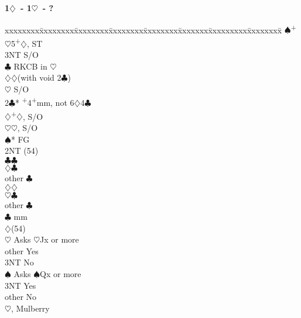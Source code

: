 \documentclass[10pt]{article}
\renewcommand{\c}{$\clubsuit$}
\renewcommand{\d}{$\diamondsuit$}
\newcommand{\h}{$\heartsuit$}
\newcommand{\s}{$\spadesuit$}
\newcommand{\p}{\textsuperscript{+}}
\newenvironment{bidtable}[1][]
{\textbf{#1}
  \begin{adjustwidth}{1em}{}
    \addvspace{2pt}
    \begin{tabbing}
      xxxxxxxx\=xxxxxxxx\=xxxxxxxx\=xxxxxxxx\=xxxxxxxx\=xxxxxxx\=xxxxxxxxx\=xxxxxxxx\=\kill}
{\end{tabbing}\end{adjustwidth}\bigskip}%
\begin{document}
\begin{bidtable}[1\d\ - 1\h\ - ?]
     \s  {}\p\h 5\p\d, ST                                 \\
     \> 3NT  \> S/O                                             \\
     \c  \> RKCB in \h                                      \\
     \d  {}\d (with void 2\c)                             \\
     \h  \> S/O                                             \\
2\c* {}\p 4\p mm, not 6\d 4\c                                 \\
     \d  {}\p\d, S/O                                      \\
     \h  {}\h, S/O                                        \\
     \s* \> FG                                              \\
     \>      \> 2NT (54)                                   \\
     \>      \>     \c  {}\c                              \\
     \>      \>     \>      \d   {}\c                     \\
     \>      \>     \>      \> other \c                     \\
     \>      \>     \d  {}\d                              \\
     \>      \>     \>      \h   {}\c                     \\
     \>      \>     \>      \> other \c                     \\
     \>      \c {} mm                                    \\
     \>      \d {}(54)                                   \\
     \>      \>     \h  \> Asks \h Jx or more               \\
     \>      \>     \>      \> other \> Yes                     \\
     \>      \>     \>      \> 3NT   \> No                      \\
     \>      \>     \s  \> Asks \s Qx or more               \\
     \>      \>     \>      \> 3NT   \> Yes                     \\
     \>      \>     \>      \> other \> No                      \\
     \>      \h {}, Mulberry                           \\

\end{bidtable}
\end{document}
